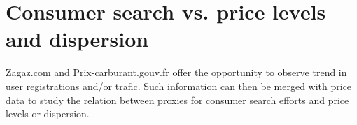 \documentclass[11pt]{article}
\begin{document}
\section{Consumer search vs. price levels and dispersion}

Zagaz.com and Prix-carburant.gouv.fr offer the opportunity to observe trend in user registrations and/or trafic. Such information can then be merged with price data to study the relation between proxies for consumer search efforts and price levels or dispersion.
\end{document}
